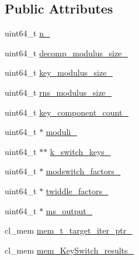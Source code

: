 \subsection*{Public Attributes}
\begin{DoxyCompactItemize}
\item 
uint64\-\_\-t \hyperlink{structintel_1_1hexl_1_1fpga_1_1FPGAObject__KeySwitch_a452ad0b22caf51b8c8f4f744c0bc7919}{n\-\_\-}
\item 
uint64\-\_\-t \hyperlink{structintel_1_1hexl_1_1fpga_1_1FPGAObject__KeySwitch_a6e28d9984e10cfde846c242698d0642f}{decomp\-\_\-modulus\-\_\-size\-\_\-}
\item 
uint64\-\_\-t \hyperlink{structintel_1_1hexl_1_1fpga_1_1FPGAObject__KeySwitch_a0a8593a60170dd13fe7ad108a757d2ec}{key\-\_\-modulus\-\_\-size\-\_\-}
\item 
uint64\-\_\-t \hyperlink{structintel_1_1hexl_1_1fpga_1_1FPGAObject__KeySwitch_a401a94981eb342a63d1e6bf8682164ad}{rns\-\_\-modulus\-\_\-size\-\_\-}
\item 
uint64\-\_\-t \hyperlink{structintel_1_1hexl_1_1fpga_1_1FPGAObject__KeySwitch_a3ad113db09b041064f5555f1a9b2491e}{key\-\_\-component\-\_\-count\-\_\-}
\item 
uint64\-\_\-t $\ast$ \hyperlink{structintel_1_1hexl_1_1fpga_1_1FPGAObject__KeySwitch_aeada90060e405a6c8dfae14935389324}{moduli\-\_\-}
\item 
uint64\-\_\-t $\ast$$\ast$ \hyperlink{structintel_1_1hexl_1_1fpga_1_1FPGAObject__KeySwitch_ad5d7d8967bbd7bddbd3ec553bb333c70}{k\-\_\-switch\-\_\-keys\-\_\-}
\item 
uint64\-\_\-t $\ast$ \hyperlink{structintel_1_1hexl_1_1fpga_1_1FPGAObject__KeySwitch_aa2459a3f7c2e920d15fc80b9551a9b11}{modswitch\-\_\-factors\-\_\-}
\item 
uint64\-\_\-t $\ast$ \hyperlink{structintel_1_1hexl_1_1fpga_1_1FPGAObject__KeySwitch_a6e27013c13e95dc4869ba7f82d6e1b0c}{twiddle\-\_\-factors\-\_\-}
\item 
uint64\-\_\-t $\ast$ \hyperlink{structintel_1_1hexl_1_1fpga_1_1FPGAObject__KeySwitch_a4e6b81a796415ec4926aa3c82304b7c1}{ms\-\_\-output\-\_\-}
\item 
cl\-\_\-mem \hyperlink{structintel_1_1hexl_1_1fpga_1_1FPGAObject__KeySwitch_ab0cf2a7036433760c7da47d035e6b838}{mem\-\_\-t\-\_\-target\-\_\-iter\-\_\-ptr\-\_\-}
\item 
cl\-\_\-mem \hyperlink{structintel_1_1hexl_1_1fpga_1_1FPGAObject__KeySwitch_af917dde3e47a5a1339891599c48bca6f}{mem\-\_\-\-Key\-Switch\-\_\-results\-\_\-}
\end{DoxyCompactItemize}
